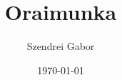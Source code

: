 \documentclass{book}
\begin{document}

\title{Oraimunka}
\author{Szendrei Gabor}
\date{\today}
\maketitle
\blindtext
\blindtext
\end{document}
